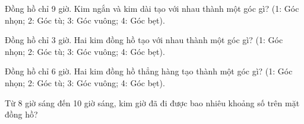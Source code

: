 \begin{ex} %
Đồng hồ chỉ 9 giờ. Kim ngắn và kim dài tạo với nhau thành một góc gì? (1: Góc nhọn; 2: Góc tù; 3: Góc vuông; 4: Góc bẹt).
\end{ex}

\begin{ex} %
Đồng hồ chỉ 3 giờ. Hai kim đồng hồ tạo với nhau thành một góc gì? (1: Góc nhọn; 2: Góc tù; 3: Góc vuông; 4: Góc bẹt).
\end{ex}

\begin{ex} %
Đồng hồ chỉ 6 giờ. Hai kim đồng hồ thẳng hàng tạo thành một góc gì? (1: Góc nhọn; 2: Góc tù; 3: Góc vuông; 4: Góc bẹt).
\end{ex}

\begin{ex} %
Từ 8 giờ sáng đến 10 giờ sáng, kim giờ đã đi được bao nhiêu khoảng số trên mặt đồng hồ?
\end{ex}
